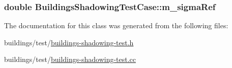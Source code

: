 \subsubsection[{\texorpdfstring{m\+\_\+sigma\+Ref}{m_sigmaRef}}]{\setlength{\rightskip}{0pt plus 5cm}double Buildings\+Shadowing\+Test\+Case\+::m\+\_\+sigma\+Ref\hspace{0.3cm}{\ttfamily [private]}}\hypertarget{classBuildingsShadowingTestCase_ad4097476ecd00715b6850a37982a5ed6}{}\label{classBuildingsShadowingTestCase_ad4097476ecd00715b6850a37982a5ed6}


The documentation for this class was generated from the following files\+:\begin{DoxyCompactItemize}
\item 
buildings/test/\hyperlink{buildings-shadowing-test_8h}{buildings-\/shadowing-\/test.\+h}\item 
buildings/test/\hyperlink{buildings-shadowing-test_8cc}{buildings-\/shadowing-\/test.\+cc}\end{DoxyCompactItemize}
